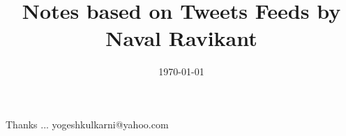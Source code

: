 \documentclass[xcolor=dvipsnames,compress,t,pdf]{beamer}
\title[How to get rich\hspace{4cm} \insertframenumber /\inserttotalframenumber]
{Notes based on Tweets Feeds by Naval Ravikant}
\subtitle[]{}
\date[2014]{\today}
\begin{document}
\begin{frame}
\titlepage
\end{frame}




\begin{frame}[c]{}
Thanks ...
\vspace{5mm}
yogeshkulkarni@yahoo.com
\end{frame}
\end{document}
